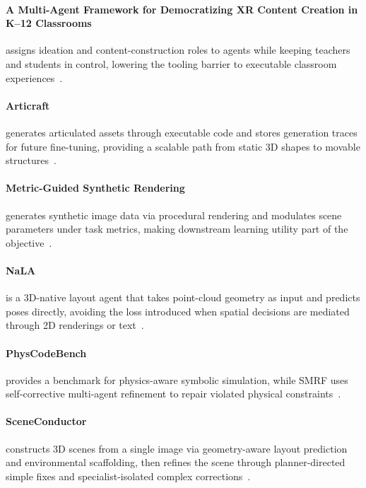 \paragraph{A Multi-Agent Framework for Democratizing XR Content Creation in K--12 Classrooms} assigns ideation and content-construction roles to agents while keeping teachers and students in control, lowering the tooling barrier to executable classroom experiences~\cite{avg260404728}.

\paragraph{Articraft} generates articulated assets through executable code and stores generation traces for future fine-tuning, providing a scalable path from static 3D shapes to movable structures~\cite{avg260515187}.

\paragraph{Metric-Guided Synthetic Rendering} generates synthetic image data via procedural rendering and modulates scene parameters under task metrics, making downstream learning utility part of the objective~\cite{avg260712874}.

\paragraph{NaLA} is a 3D-native layout agent that takes point-cloud geometry as input and predicts poses directly, avoiding the loss introduced when spatial decisions are mediated through 2D renderings or text~\cite{avg260629395}.

\paragraph{PhysCodeBench} provides a benchmark for physics-aware symbolic simulation, while SMRF uses self-corrective multi-agent refinement to repair violated physical constraints~\cite{xie2026physcodebench}.

\paragraph{SceneConductor} constructs 3D scenes from a single image via geometry-aware layout prediction and environmental scaffolding, then refines the scene through planner-directed simple fixes and specialist-isolated complex corrections~\cite{avg260608402}.

